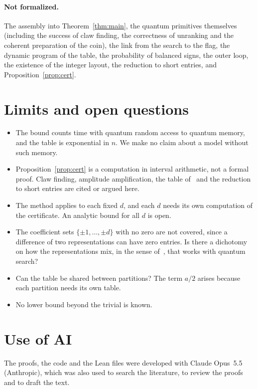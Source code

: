 \documentclass[11pt]{article}
\theoremstyle{remark}
\begin{document}
\paragraph{Not formalized.} The assembly into Theorem~\ref{thm:main}, the quantum primitives themselves (including the success of claw finding, the correctness of unranking and the coherent preparation of the coin), the link from the search to the flag, the dynamic program of the table, the probability of balanced signs, the outer loop, the existence of the integer layout, the reduction to short entries, and Proposition~\ref{prop:cert}.

\section{Limits and open questions}

\begin{itemize}[leftmargin=1.5em]
\item The bound counts time with quantum random access to quantum memory, and the table is exponential in $n$. We make no claim about a model without such memory.
\item Proposition~\ref{prop:cert} is a computation in interval arithmetic, not a formal proof. Claw finding, amplitude amplification, the table of~\cite{AHJKS22} and the reduction to short entries are cited or argued here.
\item The method applies to each fixed $d$, and each $d$ needs its own computation of the certificate. An analytic bound for all $d$ is open.
\item The coefficient sets $\{\pm1,\dots,\pm d\}$ with no zero are not covered, since a difference of two representations can have zero entries. Is there a dichotomy on how the representations mix, in the sense of~\cite{RW26}, that works with quantum search?
\item Can the table be shared between partitions? The term $a/2$ arises because each partition needs its own table.
\item No lower bound beyond the trivial is known.
\end{itemize}

\section*{Use of AI}

The proofs, the code and the Lean files were developed with Claude Opus~5.5 (Anthropic), which was also used to search the literature, to review the proofs and to draft the text.
\end{document}
